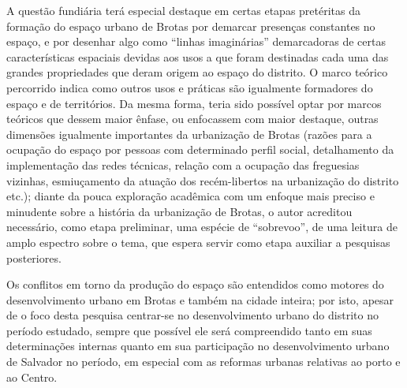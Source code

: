 A questão fundiária terá especial destaque em certas etapas pretéritas da formação do espaço urbano de Brotas por demarcar presenças constantes no espaço, e por desenhar algo como ``linhas imaginárias'' demarcadoras de certas características espaciais devidas aos usos a que foram destinadas cada uma das grandes propriedades que deram origem ao espaço do distrito. O marco teórico percorrido indica como outros usos e práticas são igualmente formadores do espaço e de territórios. Da mesma forma, teria sido possível optar por marcos teóricos que dessem maior ênfase, ou enfocassem com maior destaque, outras dimensões igualmente importantes da urbanização de Brotas (razões para a ocupação do espaço por pessoas com determinado perfil social, detalhamento da implementação das redes técnicas, relação com a ocupação das freguesias vizinhas, esmiuçamento da atuação dos recém-libertos na urbanização do distrito etc.); diante da pouca exploração acadêmica com um enfoque mais preciso e minudente sobre a história da urbanização de Brotas, o autor acreditou necessário, como etapa preliminar, uma espécie de ``sobrevoo'', de uma leitura de amplo espectro sobre o tema, que espera servir como etapa auxiliar a pesquisas posteriores. 

Os conflitos em torno da produção do espaço são entendidos como motores do desenvolvimento urbano em Brotas e também na cidade inteira; por isto, apesar de o foco desta pesquisa centrar-se no desenvolvimento urbano do distrito no período estudado, sempre que possível ele será compreendido tanto em suas determinações internas quanto em sua participação no desenvolvimento urbano de Salvador no período, em especial com as reformas urbanas relativas ao porto e ao Centro. 

